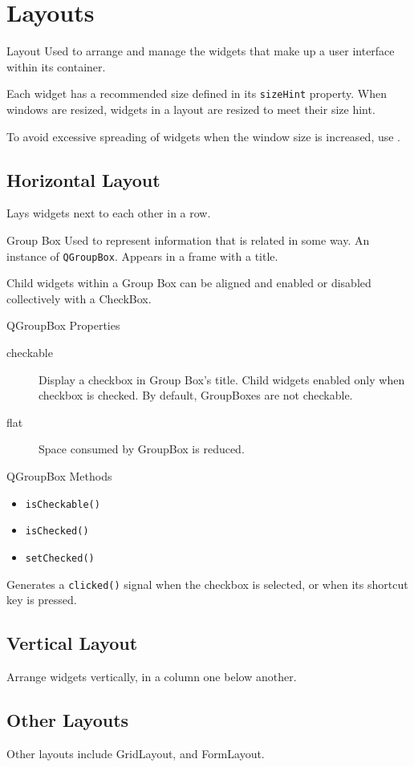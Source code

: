 \documentclass[notes.tex]{subfiles}
\begin{document}
		\section{Layouts}
			\begin{definition}{Layout}
				Used to arrange and manage the widgets that make up a user interface within its container.
			\end{definition}
			Each widget has a recommended size defined in its \verb|sizeHint| property. When windows are resized, widgets in a layout are resized to meet their size hint.

			To avoid excessive spreading of widgets when the window size is increased, use .
			\subsection{Horizontal Layout}
				Lays widgets next to each other in a row.
				\begin{definition}{Group Box}
					Used to represent information that is related in some way. An instance of \verb|QGroupBox|. Appears in a frame with a title.

					Child widgets within a Group Box can be aligned and enabled or disabled collectively with a CheckBox.
					\begin{sidenote}{QGroupBox Properties}
						\begin{description}
							\item[checkable] Display a checkbox in Group Box's title. Child widgets enabled only when checkbox is checked. By default, GroupBoxes are not checkable.
							\item[flat] Space consumed by GroupBox is reduced.  
						\end{description}
					\end{sidenote}
					\begin{sidenote}{QGroupBox Methods}
						\vspace*{-0.5cm}
						\begin{multicols}{3}
							\begin{itemize}[nosep]
								\item \verb|isCheckable()|
								\item \verb|isChecked()|
								\item \verb|setChecked()|
							\end{itemize}
						\end{multicols}
					\end{sidenote}
					Generates a \verb|clicked()| signal when the checkbox is selected, or when its shortcut key is pressed.
				\end{definition}

			\subsection{Vertical Layout}
				Arrange widgets vertically, in a column one below another.

			\subsection{Other Layouts}
				Other layouts include GridLayout, and FormLayout.

\end{document}
